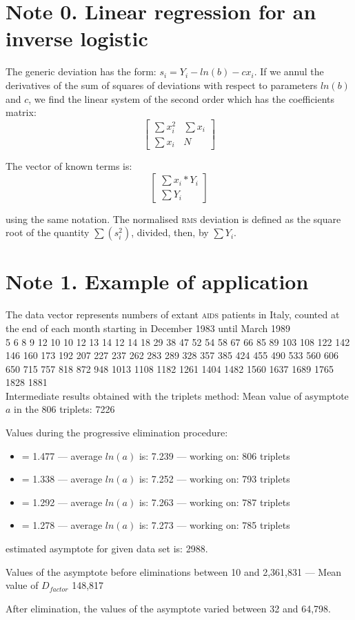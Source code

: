 \documentclass[%
 aip,
 jmp,%
 amsmath,amssymb,
 reprint,%
]{revtex4-1}
\begin{document}
\newpage

\section{\label{sec:level1}Note 0. Linear regression for an inverse logistic}

The generic deviation has the form: $s_i = Y_i - ln(b) - c x_i$. If we annul the derivatives of the sum of squares  of deviations with respect to parameters $ln(b)$ and $c$, we find the linear system of the second order which has the coefficients matrix:
\[
\begin{bmatrix}
  \sum x_i^2 &  \sum x_i \\
  \sum x_i & N
\end{bmatrix}
\]

The vector of known terms is:
\[
\begin{bmatrix}
	\sum x_i * Y_i \\ 
	\sum Y_i
\end{bmatrix}
\]

using the same notation.
The normalised \textsc{rms} deviation is defined as the square root of the quantity $\sum(s_i^2)$, divided, then, by $\sum Y_i$.

\section{\label{sec:level1}Note 1. Example of application}
The data vector  represents numbers  of extant \textsc{aids} patients in Italy, counted at the end of each month  starting in December 1983 until March 1989\\

5    6    8    9   12   10   10   12   13   14   12   14    18   29   38   47   52   54   58   67   66   85   89  103   108  122  142  146  160  173  192  207  227  237  262  283 289  328  357  385  424  455  490  533  560  606  650  715 757  818  872  948 1013 1108 1182 1261 1404 1482 1560 1637 1689 1765 1828 1881\\

Intermediate results obtained with the triplets method:
Mean value of asymptote $a$ in the 806 triplets: 7226

Values during the progressive elimination procedure:

\begin{itemize}  
\item = 1.477 --- average $ln(a)$ is: 7.239 --- working on:  806 triplets
\item = 1.338 --- average $ln(a)$ is: 7.252 --- working on:  793 triplets
\item = 1.292 --- average $ln(a)$ is: 7.263 --- working on:  787 triplets
\item = 1.278 --- average $ln(a)$ is: 7.273 --- working on:  785 triplets

\end{itemize}
estimated asymptote for given data set is:  2988.

Values of the asymptote before eliminations between 10 and 2,361,831 --- Mean value of $D_{factor}$ 148,817

After elimination, the values of the asymptote varied between 32 and 64,798.
\end{document}
